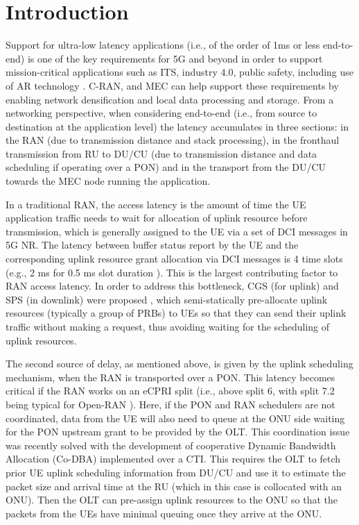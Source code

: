 \documentclass[a4paper, oneside, twocolumn, notitlepage, 10pt]{extarticle_ecoc}
\begin{document}
\section{Introduction}\label{sec:Intro}
	Support for ultra-low latency applications (i.e., of the order of 1ms or less end-to-end) is one of the key requirements for 5G and beyond in order to support mission-critical applications such as \ac{ITS}, industry 4.0, public safety, including use of \ac{AR} technology \cite{5G-NGMN-Verticals}. \ac{C-RAN}, and \ac{MEC} can help support these requirements by enabling network densification and local data processing and storage. From a networking perspective, when considering end-to-end (i.e., from source to destination at the application level) the latency accumulates in three sections: in the RAN (due to transmission distance and stack processing), in the fronthaul transmission from \ac{RU} to \ac{DU/CU} (due to transmission distance and data scheduling if operating over a PON) and in the transport from the DU/CU towards the MEC node running the application. 
	
	In a traditional RAN, the access latency is the amount of time the \ac{UE} application traffic needs to wait for allocation of uplink resource before transmission, which is generally assigned to the UE via a set of \ac{DCI} messages in 5G \ac{NR}. The latency between buffer status report by the UE and the corresponding uplink resource grant allocation via DCI messages is 4 time slots (e.g., 2 ms for 0.5 ms slot duration \cite{5G-NR_Dahlman-Scheduling}). This is the largest contributing factor to RAN access latency. In order to address this bottleneck, \ac{CGS} (for uplink) and \ac{SPS} (in downlink) were proposed \cite{5G-NR_Dahlman}, which semi-statically pre-allocate uplink resources (typically a group of \acp{PRB}) to UEs so that they can send their uplink traffic without making a request, thus avoiding waiting for the scheduling of uplink resources. 
 	
 	The second source of delay, as mentioned above, is given by the uplink scheduling mechanism, when the RAN is transported over a PON. This latency becomes critical if the RAN works on an eCPRI split (i.e., above split 6, with split 7.2 being typical for Open-RAN \cite{ORAN_FH_Standard}). Here, if the PON and RAN schedulers are not coordinated, data from the UE will also need to queue at the ONU side waiting for the PON upstream grant to be provided by the OLT. This coordination issue was recently solved with the development of cooperative Dynamic Bandwidth Allocation (Co-DBA) \cite{Co-DBA} implemented over a \ac{CTI}\cite{O-RAN-CTI}. This requires the OLT to fetch prior UE uplink scheduling information from DU/CU and use it to estimate the packet size and arrival time at the RU (which in this case is collocated with an ONU). Then the OLT can pre-assign uplink resources to the ONU so that the packets from the UEs have minimal queuing once they arrive at the ONU. 
 	
\end{document}
